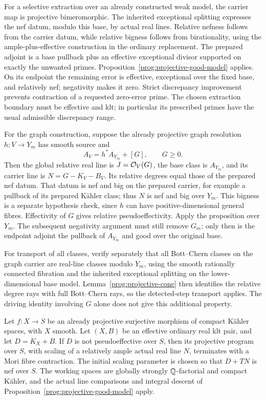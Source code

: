 \begin{remark}
\label{prog:projective-good-model-uses}
For a selective extraction over an already constructed weak model,
the carrier map is projective bimeromorphic. The inherited
exceptional splitting expresses the nef datum, modulo this base,
by actual real lines. Relative nefness follows from the carrier
datum, while relative bigness follows from birationality, using the
ample-plus-effective construction in the ordinary replacement.
The prepared adjoint is a base pullback plus an effective
exceptional divisor supported on exactly the unwanted primes.
Proposition~\ref{prog:projective-good-model} applies. On its endpoint
the remaining error is effective, exceptional over the fixed base,
and relatively nef; negativity makes it zero. Strict discrepancy
improvement prevents contraction of a requested zero-error prime.
The chosen extraction boundary must be effective and klt; in
particular its prescribed primes have the usual admissible
discrepancy range.

For the graph construction, suppose the already projective graph
resolution \(h:V\to Y_m\) has smooth source and
\[
 A_V=h^*A_{Y_m}+[G],\qquad G\geq0.
\]
Then the global relative real line is \(J=\mathcal O_V(G)\), the base
class is \(A_{Y_m}\), and its carrier line is
\(N=G-K_V-B_V\). Its relative degrees equal those of the prepared
nef datum. That datum is nef and big on the prepared carrier, for
example a pullback of its prepared Kähler class; thus \(N\) is nef
and big over \(Y_m\). This bigness is a separate hypothesis check,
since \(h\) can have positive-dimensional general fibres.
Effectivity of \(G\) gives relative pseudoeffectivity. Apply the
proposition over \(Y_m\). The subsequent negativity argument must
still remove \(G_m\); only then is the endpoint adjoint the pullback
of \(A_{Y_m}\) and good over the original base.

For transport of all classes, verify separately that all
Bott--Chern classes on the graph carrier are real-line classes
modulo \(Y_m\), using the smooth rationally connected fibration
and the inherited exceptional splitting on the lower-dimensional
base model. Lemma~\ref{prog:projective-cone} then identifies
the relative degree rays with full Bott--Chern rays, so the
detected-step transport applies. The driving identity involving
\(G\) alone does not give this additional property.
\end{remark}

\begin{corollary}
\label{prog:projective-mori}
Let \(f:X\to S\) be an already projective surjective morphism of
compact Kähler spaces, with \(X\) smooth. Let \((X,B)\) be an
effective ordinary real klt pair, and let \(D=K_X+B\). If \(D\)
is not pseudoeffective over \(S\), then its projective program over
\(S\), with scaling of a relatively ample actual real line \(N\),
terminates with a Mori fibre contraction. The initial scaling
parameter is chosen so that \(D+TN\) is nef over \(S\).
The working spaces are globally strongly \(\mathbb Q\)-factorial and
compact Kähler, and the actual line comparisons and integral
descent of Proposition~\ref{prog:projective-good-model} apply.
\end{corollary}

